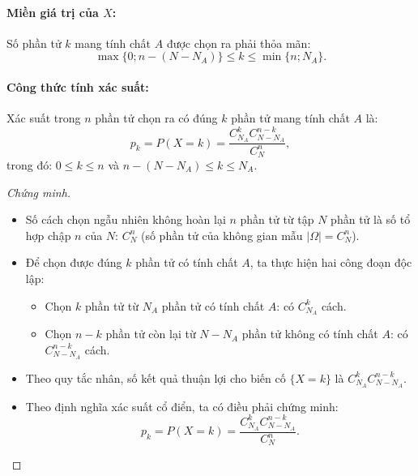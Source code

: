 \documentclass[12pt,a4paper]{article}
\theoremstyle{definition}
\begin{document}
\paragraph{Miền giá trị của $X$:}
Số phần tử $k$ mang tính chất $A$ được chọn ra phải thỏa mãn:
\[
\max\{0; n - (N - N_A)\} \le k \le \min\{n; N_A\}.
\]

\paragraph{Công thức tính xác suất:}
Xác suất trong $n$ phần tử chọn ra có đúng $k$ phần tử mang tính chất $A$ là:
\[
p_k = P(X = k) = \frac{C_{N_A}^k C_{N - N_A}^{n - k}}{C_N^n},
\]
trong đó: $0 \le k \le n$ và $n - (N - N_A) \le k \le N_A$.

\begin{proof}[Chứng minh]
\begin{itemize}
    \item Số cách chọn ngẫu nhiên không hoàn lại $n$ phần tử từ tập $N$ phần tử là số tổ hợp chập $n$ của $N$: $C_N^n$ (số phần tử của không gian mẫu $|\Omega| = C_N^n$).
    \item Để chọn được đúng $k$ phần tử có tính chất $A$, ta thực hiện hai công đoạn độc lập:
    \begin{itemize}
        \item Chọn $k$ phần tử từ $N_A$ phần tử có tính chất $A$: có $C_{N_A}^k$ cách.
        \item Chọn $n - k$ phần tử còn lại từ $N - N_A$ phần tử không có tính chất $A$: có $C_{N - N_A}^{n - k}$ cách.
    \end{itemize}
    \item Theo quy tắc nhân, số kết quả thuận lợi cho biến cố $\{X = k\}$ là $C_{N_A}^k C_{N - N_A}^{n - k}$.
    \item Theo định nghĩa xác suất cổ điển, ta có điều phải chứng minh:
    \[
    p_k = P(X = k) = \frac{C_{N_A}^k C_{N - N_A}^{n - k}}{C_N^n}.
    \]
\end{itemize}
\end{proof}
\end{document}
